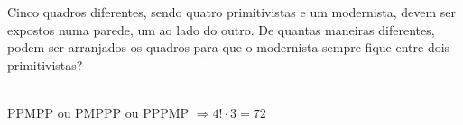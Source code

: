 \begin{ex}
Cinco quadros diferentes, sendo quatro primitivistas e um modernista, devem ser expostos numa parede, um ao lado do outro. De quantas maneiras diferentes, podem ser arranjados os quadros para que o modernista sempre fique entre  dois primitivistas?
  \begin{sol}
    \phantom{A}\\
    PPMPP ou PMPPP ou PPPMP  $\Longrightarrow 4!\cdot3=72$
  \end{sol}
\end{ex}